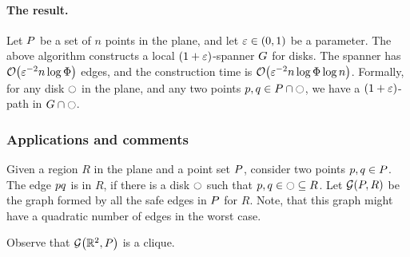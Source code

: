 \documentclass[12pt]{article}%
\begin{document}
\paragraph{The result.}

\begin{theorem}
    Let $P$ be a set of $n$ points in the plane, and let
    $\varepsilon \in (0,1)$ be a parameter. The above algorithm constructs a
    local $(1+\varepsilon)$-spanner $G$ for disks. The spanner has
    $\Of\pth{ \eps^{-2} n\log \spread }$ edges, and the construction
    time is $\Of\pth{ \eps^{-2} n\log \spread \log n }$.  Formally,
    for any disk $\ocircle$ in the plane, and any two points
    $p, q \in P \cap \ocircle$, we have a $(1+\varepsilon)$-path in
    $G \cap {\ocircle}$.
\end{theorem}

\subsubsection{Applications and comments}


\begin{defn}
    Given a region $R$ in the plane and a point set $P$, consider
    two points $p, q \in P$. The edge $p q$ is 
    in $R$, if there is a disk $\ocircle$ such that
    $p,q \in \ocircle \subseteq R$. Let $\GY{\PS}{R}$ be the graph
    formed by all the safe edges in $P$ for $R$. Note, that this
    graph might have a quadratic number of edges in the worst case.
\end{defn}

Observe that $\GY{\Re^2}{\PS}$ is a clique.
\end{document}
